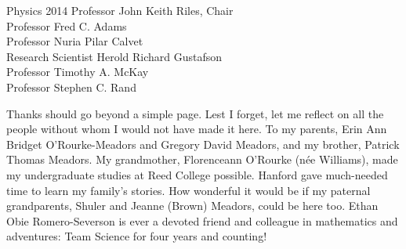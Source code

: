 \documentclass[leqno,twoside]{report}
\theoremstyle{plain}
\theoremstyle{definition}
\theoremstyle{remark}
\numberwithin{theorem}{chapter}        %
\begin{document}





{Physics} {2014}
{ Professor John Keith Riles, Chair \\
  Professor Fred C. Adams\\
  Professor Nuria Pilar Calvet\\
  Research Scientist Herold Richard Gustafson\\
  Professor Timothy A. McKay\\
  Professor Stephen C. Rand
 }



\initializefrontsections

{}

\setcounter{page}{1}


\startacknowledgementspage


Thanks should go beyond a simple page. 
Lest I forget, let me reflect on all the people without whom I would not have made it here. 
To my parents, Erin Ann Bridget O'Rourke-Meadors and Gregory David Meadors, and my brother, Patrick Thomas Meadors. 
My grandmother, Florenceann O'Rourke (n\'{e}e Williams), made my undergraduate studies at Reed College possible.
Hanford gave much-needed time to learn my family's stories.
How wonderful it would be if my paternal grandparents, Shuler and Jeanne (Brown) Meadors, could be here too.
Ethan Obie Romero-Severson is ever a devoted friend and colleague in mathematics and adventures: Team Science for four years and counting!
\end{document}
